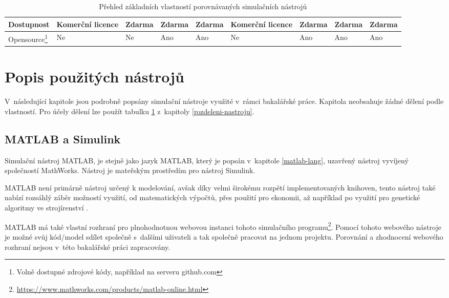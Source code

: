 \begin{savenotes}
\begin{table}[]
{\begin{tabular}{|l|l|l|l|l|l|l|l|l|}
Dostupnost                                                                                          & Komerční licence & Zdarma     & Zdarma & Zdarma  & Komerční licence & Zdarma                                                   & Zdarma    & Zdarma         \\ \hline
Opensource\footnote{Volně dostupné zdrojové kódy, například na serveru github.com} & Ne                                                                                                              & Ne         & Ano    & Ano     & Ne               & Ano                                                      & Ano        & Ano            \\ \hline
\end{tabular}%
}
\caption{Přehled základních vlastností porovnávaných simulačních nástrojů}
\label{tab:rozdeleni-nastroju}
\end{table}
\end{savenotes}



\section{Popis použitých nástrojů}
\label{popis-nastroju}
V~následující kapitole jsou podrobně popsány simulační nástroje využité v~rámci bakalářské práce. Kapitola neobsahuje žádné dělení podle vlastností. Pro účely dělení lze použít tabulku \ref{tab:rozdeleni-nastroju} z~kapitoly \ref{rozdeleni-nastroju}. 
\subsection{MATLAB a Simulink}
\label{matlab-desc}

Simulační nástroj MATLAB, je stejně jako jazyk MATLAB, který je popsán v~kapitole \ref{matlab-lang}, uzavřený nástroj vyvíjený společností MathWorks. Nástroj je mateřským prostředím pro nástroj Simulink. 

MATLAB není primárně nástroj určený k modelování, avšak díky velmi širokému rozpětí implementovaných knihoven, tento nástroj také nabízí rozsáhlý záběr možností využití, od matematických výpočtů, přes použití pro ekonomii, až například po využití pro genetické algoritmy ve strojírenství \cite{Zapletal2016}.

MATLAB má také vlastní rozhraní pro plnohodnotnou webovou instanci tohoto simulačního programu\footnote{\url{https://www.mathworks.com/products/matlab-online.html}}. Pomocí tohoto webového nástroje je možné svůj kód/model sdílet společně s~dalšími uživateli a tak společně pracovat na jednom projektu. Porovnání a zhodnocení webového rozhraní nejsou v~této bakalářské práci zapracovány.


